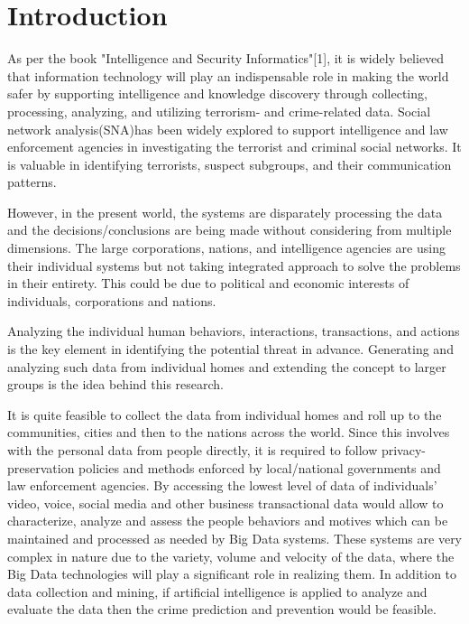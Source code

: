 \documentclass[sigconf]{acmart}
\begin{document}
\section{Introduction}
As per the book "Intelligence and Security Informatics"[1], it is widely believed that information technology will play an indispensable role in making the world safer by supporting intelligence and knowledge discovery through collecting, processing, analyzing, and utilizing terrorism- and crime-related data. Social network analysis(SNA)has been widely explored to support intelligence and law enforcement agencies in investigating the terrorist and criminal social networks. It is valuable in identifying terrorists, suspect subgroups, and their communication patterns.

However, in the present world, the systems are disparately processing the data and the decisions/conclusions are being made without considering from multiple dimensions. The large corporations, nations, and intelligence agencies are using their individual systems but not taking integrated approach to solve the problems in their entirety. This could be due to political and economic interests of individuals, corporations and nations.

Analyzing the individual human behaviors, interactions, transactions, and actions is the key element in identifying the potential threat in advance. Generating and analyzing such data from individual homes and extending the concept to larger groups is the idea behind this research.

It is quite feasible to collect the data from individual homes and roll up to the communities, cities and then to the nations across the world. Since this involves with the personal data from people directly, it is required to follow privacy-preservation policies and methods enforced by local/national governments and law enforcement agencies. By accessing the lowest level of data of individuals’ video, voice, social media and other business transactional data would allow to characterize, analyze and assess the people behaviors and motives which can be maintained and processed as needed by Big Data systems. These systems are very complex in nature due to the variety, volume and velocity of the data, where the Big Data technologies will play a significant role in realizing them. In addition to data collection and mining, if artificial intelligence is applied to analyze and evaluate the data then the crime prediction and prevention would be feasible.
\end{document}
